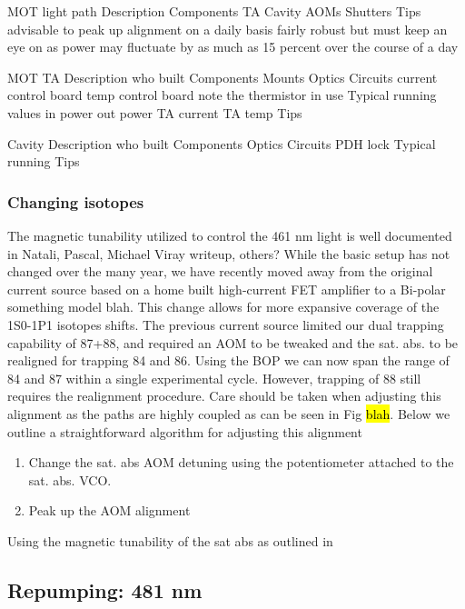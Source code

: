 MOT light path
	Description
	Components
		TA
		Cavity
		AOMs
		Shutters
	Tips
		advisable to peak up alignment on a daily basis 		
		fairly robust but must keep an eye on as power may fluctuate by as much as 15 percent over the course of a day
	
	MOT TA
		Description
			who built
		Components
			Mounts
			Optics
			Circuits
				current control board
				temp control board
					note the thermistor in use
		Typical running values
			in power
			out power
			TA current
			TA temp
		Tips
		
	Cavity
		Description
			who built
		Components
			Optics
			Circuits
				PDH lock
		Typical running
		Tips


	
	

\subsubsection{Changing isotopes} \label{sssec:change_iso}

The magnetic tunability utilized to control the 461 nm light is well documented in Natali, Pascal, Michael Viray  writeup, others? While the basic setup has not changed over the many year, we have recently moved away from the original current source based on a home built high-current FET amplifier to a Bi-polar something model blah. This change allows for more expansive coverage of the 1S0-1P1 isotopes shifts. The previous current source limited our dual trapping capability of 87+88, and required an AOM to be tweaked and the sat. abs. to be realigned for trapping 84 and 86. Using the BOP we can now span the range of 84 and 87 within a single experimental cycle. However, trapping of 88 still requires the realignment procedure. Care should be taken when adjusting this alignment as the paths are highly coupled as can be seen in Fig \hl{blah}. Below we outline a straightforward algorithm for adjusting this alignment

\begin{enumerate}
\item Change the sat. abs AOM detuning using the potentiometer attached to the sat. abs. VCO. 
\item Peak up the AOM alignment

\end{enumerate}

Using the magnetic tunability of the sat abs as outlined in 

\subsection{Repumping: 481 nm}
\label{ssec:481sys}

